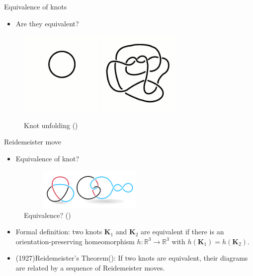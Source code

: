 \documentclass[]{beamer}
\begin{document}
\begin{frame}{Equivalence of knots}
\begin{itemize}
    \item Are they equivalent?
\end{itemize}
\begin{figure}
   \centering
    \includegraphics[width = 4cm]{Pictures/Simple.png}
    \includegraphics[width = 4cm]{Pictures/complex.png}
    \caption{Knot unfolding (\cite{knotsunfolding})}
    \label{fig:enter-label}
\end{figure}

\end{frame}


\begin{frame}{Reidemeister move}
\begin{itemize}
    \item Equivalence of knot?
\end{itemize}
\begin{figure}
   \centering
\includegraphics[width=7cm, height = 2cm]{Pictures/equivalence.png} 
    \caption{Equivalence? (\cite{Equivalence})}
    \label{fig:enter-label}
\end{figure}


\begin{itemize}
    \item Formal definition: two knots $\mathbf{K}_1$ and $\mathbf{K}_2$ are equivalent if there is an orientation-preserving homeomorphism $h:\mathbb{R}^3 \rightarrow \mathbb{R}^3$ with $h(\mathbf{K}_1) = h(\mathbf{K}_2)$.
\end{itemize}

\begin{itemize}
    \item (1927)Reidemeister's Theorem(\cite{Reidemeister}): If two knots are equivalent, their diagrams are related by a sequence of Reidemeister moves.
\end{itemize}
\end{frame}
\end{document}
